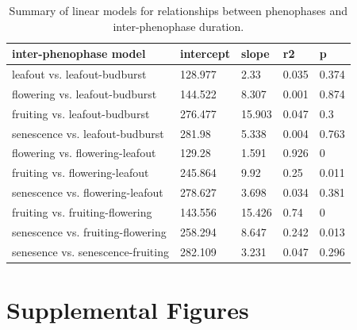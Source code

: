 \documentclass{article}
\begin{document}
\begin{table}[ht]
\centering
\caption{Summary of linear models for relationships between phenophases and inter-phenophase duration.} 
\label{table:interphase}
\begin{tabular}{|p{}|p{}p{}p{}p{}|}
  \hline
inter-phenophase model & intercept & slope & r2 & p \\ 
  \hline
leafout vs. leafout-budburst & 128.977 & 2.33 & 0.035 & 0.374 \\ 
  flowering vs. leafout-budburst & 144.522 & 8.307 & 0.001 & 0.874 \\ 
  fruiting vs. leafout-budburst & 276.477 & 15.903 & 0.047 & 0.3 \\ 
  senescence vs. leafout-budburst & 281.98 & 5.338 & 0.004 & 0.763 \\ 
  flowering vs. flowering-leafout & 129.28 & 1.591 & 0.926 & 0 \\ 
  fruiting vs. flowering-leafout & 245.864 & 9.92 & 0.25 & 0.011 \\ 
  senescence vs. flowering-leafout & 278.627 & 3.698 & 0.034 & 0.381 \\ 
  fruiting vs. fruiting-flowering & 143.556 & 15.426 & 0.74 & 0 \\ 
  senescence vs. fruiting-flowering & 258.294 & 8.647 & 0.242 & 0.013 \\ 
  senesence vs. senescence-fruiting & 282.109 & 3.231 & 0.047 & 0.296 \\ 
   \hline
\end{tabular}
\end{table}\clearpage

\section* {Supplemental Figures}
\end{document}
